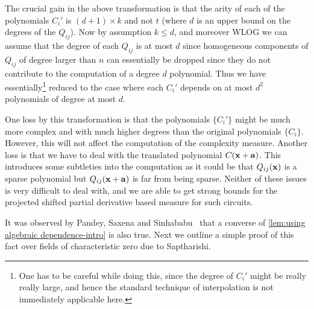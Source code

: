 The crucial gain in the above transformation is that  the arity of each of the polynomials  $C_i'$ is $(d+1) \times k$ and not $t$ (where $d$ is an upper bound on the degrees of the $Q_{ij}$). Now by assumption $k \leq d$, and moreover WLOG we can assume that the degree of each $Q_{ij}$ is at most $d$ since homogeneous components of $Q_{ij}$ of degree larger than $n$ can essentially be dropped since they do not contribute to the computation of a degree $d$ polynomial. Thus we have essentially\footnote{One has to be careful while doing this, since the degree of $C_i'$ might be really really large, and hence the standard technique of interpolation is not immediately applicable here.} reduced to the case where each $C_i'$ depends on at most $d^2$ polynomials of degree at most $d$.  

One loss by this transformation is that the polynomials $\{C_i'\}$ might be much more complex and with much higher degrees than the original polynomials $\{C_i\}$. However, this will not affect the computation of the complexity measure. Another loss is that we have to deal with the translated polynomial $C(\mathbf{x} + \mathbf{a})$. This introduces some subtleties into the computation as it could be that $Q_{ij}(\mathbf{x})$ is a sparse polynomial but $Q_{ij}(\mathbf{x}+ \mathbf{a})$ is far from being sparse. Neither of these issues is very difficult to deal with, and we are able to get strong bounds for the projected shifted partial derivative based measure for such circuits. 

It was observed by Pandey, Saxena and Sinhababu~\cite{PSS16} that a converse of \autoref{lem:using algebraic dependence-intro} is also true. Next we outline a simple proof of this fact over fields of characteristic zero due to Saptharishi. 

